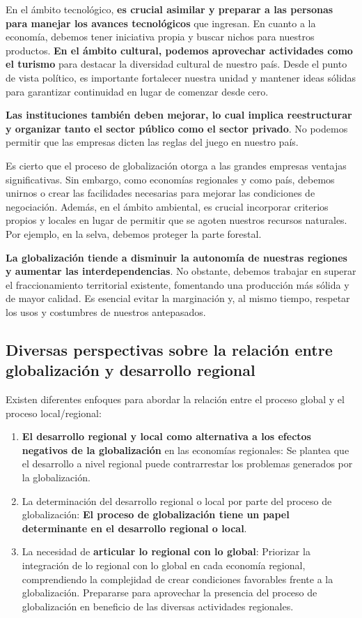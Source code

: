 \documentclass[
  a4paper,
]{article}
\begin{document}
En el ámbito tecnológico, \textbf{es crucial asimilar y preparar a las
personas para manejar los avances tecnológicos} que ingresan. En cuanto
a la economía, debemos tener iniciativa propia y buscar nichos para
nuestros productos. \textbf{En el ámbito cultural, podemos aprovechar
actividades como el turismo} para destacar la diversidad cultural de
nuestro país. Desde el punto de vista político, es importante fortalecer
nuestra unidad y mantener ideas sólidas para garantizar continuidad en
lugar de comenzar desde cero.

\textbf{Las instituciones también deben mejorar, lo cual implica
reestructurar y organizar tanto el sector público como el sector
privado}. No podemos permitir que las empresas dicten las reglas del
juego en nuestro país.

Es cierto que el proceso de globalización otorga a las grandes empresas
ventajas significativas. Sin embargo, como economías regionales y como
país, debemos unirnos o crear las facilidades necesarias para mejorar
las condiciones de negociación. Además, en el ámbito ambiental, es
crucial incorporar criterios propios y locales en lugar de permitir que
se agoten nuestros recursos naturales. Por ejemplo, en la selva, debemos
proteger la parte forestal.

\textbf{La globalización tiende a disminuir la autonomía de nuestras
regiones y aumentar las interdependencias}. No obstante, debemos
trabajar en superar el fraccionamiento territorial existente, fomentando
una producción más sólida y de mayor calidad. Es esencial evitar la
marginación y, al mismo tiempo, respetar los usos y costumbres de
nuestros antepasados.

\subsection{Diversas perspectivas sobre la relación entre globalización
y desarrollo
regional}\label{diversas-perspectivas-sobre-la-relaciuxf3n-entre-globalizaciuxf3n-y-desarrollo-regional}

Existen diferentes enfoques para abordar la relación entre el proceso
global y el proceso local/regional:

\begin{enumerate}
\def\labelenumi{\arabic{enumi}.}
\item
  \textbf{El desarrollo regional y local como alternativa a los efectos
  negativos de la globalización} en las economías regionales: Se plantea
  que el desarrollo a nivel regional puede contrarrestar los problemas
  generados por la globalización.
\item
  La determinación del desarrollo regional o local por parte del proceso
  de globalización: \textbf{El proceso de globalización tiene un papel
  determinante en el desarrollo regional o local}.
\item
  La necesidad de \textbf{articular lo regional con lo global}:
  Priorizar la integración de lo regional con lo global en cada economía
  regional, comprendiendo la complejidad de crear condiciones favorables
  frente a la globalización. Prepararse para aprovechar la presencia del
  proceso de globalización en beneficio de las diversas actividades
  regionales.
\end{enumerate}
\end{document}
